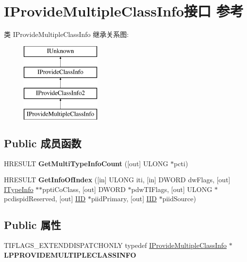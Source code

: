 \hypertarget{interface_i_provide_multiple_class_info}{}\section{I\+Provide\+Multiple\+Class\+Info接口 参考}
\label{interface_i_provide_multiple_class_info}
类 I\+Provide\+Multiple\+Class\+Info 继承关系图\+:\begin{figure}[H]
\begin{center}
\leavevmode
\includegraphics[height=4.000000cm]{interface_i_provide_multiple_class_info}
\end{center}
\end{figure}
\subsection*{Public 成员函数}
\begin{DoxyCompactItemize}
\item 
\mbox{\label{interface_i_provide_multiple_class_info_a5e9c67c336e615deb17348193a0135aa}} 
H\+R\+E\+S\+U\+LT {\bfseries Get\+Multi\+Type\+Info\+Count} (\mbox{[}out\mbox{]} U\+L\+O\+NG $\ast$pcti)
\item 
\mbox{\label{interface_i_provide_multiple_class_info_aff3dfb896272f19cfe861e1d36ce49e5}} 
H\+R\+E\+S\+U\+LT {\bfseries Get\+Info\+Of\+Index} (\mbox{[}in\mbox{]} U\+L\+O\+NG iti, \mbox{[}in\mbox{]} D\+W\+O\+RD dw\+Flags, \mbox{[}out\mbox{]} \hyperlink{interface_i_type_info}{I\+Type\+Info} $\ast$$\ast$ppti\+Co\+Class, \mbox{[}out\mbox{]} D\+W\+O\+RD $\ast$pdw\+T\+I\+Flags, \mbox{[}out\mbox{]} U\+L\+O\+NG $\ast$pcdispid\+Reserved, \mbox{[}out\mbox{]} \hyperlink{struct___i_i_d}{I\+ID} $\ast$piid\+Primary, \mbox{[}out\mbox{]} \hyperlink{struct___i_i_d}{I\+ID} $\ast$piid\+Source)
\end{DoxyCompactItemize}
\subsection*{Public 属性}
\begin{DoxyCompactItemize}
\item 
\mbox{\label{interface_i_provide_multiple_class_info_aa5f22c14b01a93832398ce130b07791a}} 
T\+I\+F\+L\+A\+G\+S\+\_\+\+E\+X\+T\+E\+N\+D\+D\+I\+S\+P\+A\+T\+C\+H\+O\+N\+LY typedef \hyperlink{interface_i_provide_multiple_class_info}{I\+Provide\+Multiple\+Class\+Info} $\ast$ {\bfseries L\+P\+P\+R\+O\+V\+I\+D\+E\+M\+U\+L\+T\+I\+P\+L\+E\+C\+L\+A\+S\+S\+I\+N\+FO}
\end{DoxyCompactItemize}
